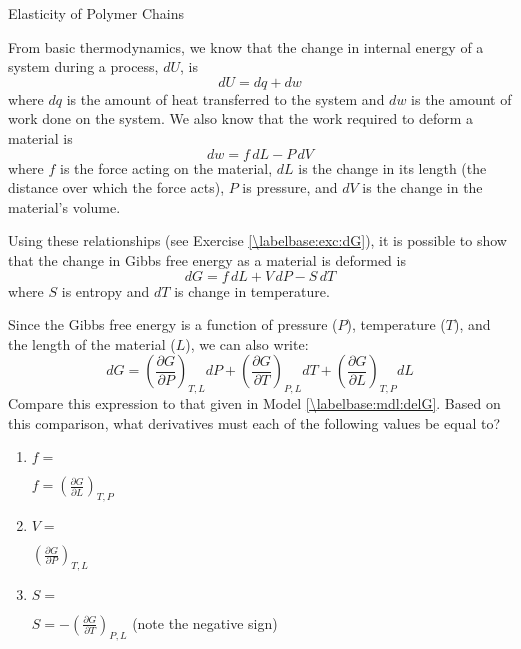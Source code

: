 \begin{activity}{Elasticity of Polymer Chains}
\begin{model}
	From basic thermodynamics, we know that the change in internal energy of a system during a process, $dU$, is
	\begin{equation*}
		dU = dq + dw
	\end{equation*}
	where $dq$ is the amount of heat transferred to the system and $dw$ is the amount of work done on the system.  We also know that the work required to deform a material is
	\begin{equation*}
		dw = f\,dL - P\,dV
	\end{equation*}
	where $f$ is the force acting on the material, $dL$ is the change in its length (the distance over which the force acts), $P$ is pressure, and $dV$ is the change in the material's volume.
	
	Using these relationships (see Exercise \ref{\labelbase:exc:dG}), it is possible to show that the change in Gibbs free energy as a material is deformed is
	\begin{equation*}
		dG = f\,dL + V\,dP - S\,dT
	\end{equation*}
	where $S$ is entropy and $dT$ is change in temperature.

\end{model}


\begin{ctqs}

	\question Since the Gibbs free energy is a function of pressure ($P$), temperature ($T$), and the length of the material ($L$), we can also write:
		\begin{equation*}
				dG = \left(\frac{\partial G}{\partial P}\right)_{T,L}dP + 
					\left(\frac{\partial G}{\partial T}\right)_{P,L}dT +
					\left(\frac{\partial G}{\partial L}\right)_{T,P}dL
			\end{equation*}
		Compare this expression to that given in Model \ref{\labelbase:mdl:delG}.  Based on this comparison, what derivatives must each of the following values be equal to?
	
		\begin{enumerate}
			\item $f=$ \label{\labelbase:ctq:fderiv}
				\begin{solution}[0.25in]
					$f = \left(\frac{\partial G}{\partial L}\right)_{T,P}$
				\end{solution}
			\item $V=$
				\begin{solution}[0.25in]
					$\left(\frac{\partial G}{\partial P}\right)_{T,L}$
				\end{solution}
			\item $S=$
				\begin{solution}[0.25in]
					$S=  -\left(\frac{\partial G}{\partial T}\right)_{P,L}$ (note the negative sign)
				\end{solution}
		\end{enumerate}
		

\end{ctqs}
\end{activity}
